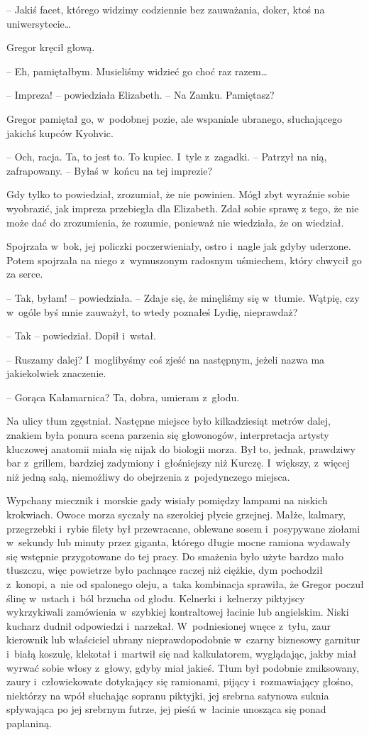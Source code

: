 \documentclass[oneside,polish,12pt,sfheadings]{mwbk}
\begin{document}
-- Jakiś facet, którego widzimy codziennie
bez zauważania, doker, ktoś na uniwersytecie\ldots

Gregor kręcił głową. 

-- Eh, pamiętałbym. Musieliśmy widzieć go choć raz
razem\ldots

-- Impreza! -- powiedziała Elizabeth. -- Na Zamku. Pamiętasz?

Gregor pamiętał go, w~podobnej pozie, ale wspaniale ubranego,
słuchającego jakichś kupców Kyohvic.

-- Och, racja. Ta, to jest to. To kupiec. I~tyle z~zagadki. -- Patrzył na
nią, zafrapowany. -- Byłaś w~końcu na tej imprezie?

Gdy tylko to powiedział, zrozumiał, że nie powinien. Mógł zbyt wyraźnie
sobie wyobrazić, jak impreza przebiegła dla Elizabeth. Zdał sobie sprawę
z tego, że nie może dać do zrozumienia, że rozumie, ponieważ nie
wiedziała, że on wiedział.

Spojrzała w~bok, jej policzki poczerwieniały, ostro i~nagle jak gdyby
uderzone. Potem spojrzała na niego z~wymuszonym radosnym uśmiechem,
który chwycił go za serce.

-- Tak, byłam! -- powiedziała. -- Zdaje się, że minęliśmy się w~tłumie.
Wątpię, czy w~ogóle byś mnie zauważył, to wtedy poznałeś Lydię,
nieprawdaż?

-- Tak -- powiedział. Dopił i~wstał.

-- Ruszamy dalej? I~moglibyśmy coś zjeść na następnym, jeżeli nazwa ma
jakiekolwiek znaczenie.

-- Gorąca Kałamarnica? Ta, dobra, umieram z~głodu.

Na ulicy tłum zgęstniał. Następne miejsce było kilkadziesiąt metrów
dalej, znakiem była ponura scena parzenia się głowonogów, interpretacja
artysty kluczowej anatomii miała się nijak do biologii morza. Był to,
jednak, prawdziwy bar z~grillem, bardziej zadymiony i~głośniejszy niż
Kurczę. I~większy, z~więcej niż jedną salą, niemożliwy do obejrzenia z~pojedynczego miejsca.

Wypchany miecznik i~morskie gady wisiały pomiędzy lampami na niskich
krokwiach. Owoce morza syczały na szerokiej płycie grzejnej. Małże,
kalmary, przegrzebki i~rybie filety był przewracane, oblewane sosem i~posypywane ziołami w~sekundy lub minuty przez giganta, którego długie
mocne ramiona wydawały się wstępnie przygotowane do tej pracy. Do
smażenia było użyte bardzo mało tłuszczu, więc powietrze było pachnące
raczej niż ciężkie, dym pochodził z~konopi, a~nie od spalonego oleju, a~taka kombinacja sprawiła, że Gregor poczuł ślinę w~ustach i~ból brzucha
od głodu. Kelnerki i~kelnerzy piktyjscy wykrzykiwali zamówienia w~szybkiej kontraltowej łacinie lub angielskim. Niski kucharz dudnił
odpowiedzi i~narzekał. W~podniesionej wnęce z~tyłu, zaur kierownik lub
właściciel ubrany nieprawdopodobnie w~czarny biznesowy garnitur i~białą
koszulę, klekotał i~martwił się nad kalkulatorem, wyglądając, jakby miał
wyrwać sobie włosy z~głowy, gdyby miał jakieś. Tłum był podobnie
zmiksowany, zaury i~człowiekowate dotykający się ramionami, pijący i~rozmawiający głośno, niektórzy na wpół słuchając sopranu piktyjki, jej
srebrna satynowa suknia spływająca po jej srebrnym futrze, jej pieśń w~łacinie unosząca się ponad paplaniną.
\end{document}

